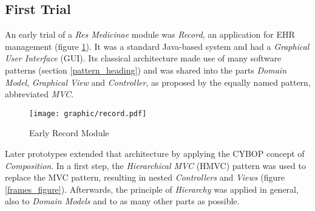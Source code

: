 %
%
%
%
%
%
%

\subsection{First Trial}
\label{first_trial_heading}

An early trial of a \emph{Res Medicinae} module was \emph{Record}, an application
for EHR management (figure \ref{record_figure}). It was a standard Java-based
system and had a \emph{Graphical User Interface} (GUI). Its classical
architecture made use of many software patterns (section \ref{pattern_heading})
and was shared into the parts \emph{Domain Model}, \emph{Graphical View} and
\emph{Controller}, as proposed by the equally named pattern, abbreviated
\emph{MVC}.

\begin{figure}[ht]
    \begin{center}
        \texttt{[image: graphic/record.pdf]}
        \caption{Early Record Module}
        \label{record_figure}
    \end{center}
\end{figure}

Later prototypes extended that architecture by applying the CYBOP concept of
\emph{Composition}. In a first step, the \emph{Hierarchical MVC} (HMVC) pattern
was used to replace the MVC pattern, resulting in nested \emph{Controllers} and
\emph{Views} (figure \ref{frames_figure}). Afterwards, the principle of
\emph{Hierarchy} was applied in general, also to \emph{Domain Models} and to as
many other parts as possible.

